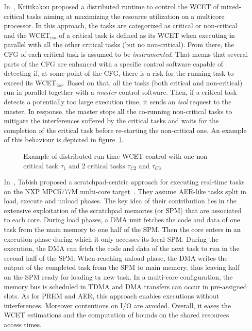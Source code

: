 \documentclass[main.tex]{subfiles}
\begin{document}
In~\cite{Kritikakou2014}, Kritikakou \etal proposed a distributed runtime to control the WCET of mixed-critical tasks aiming at maximizing the resource utilization on a multicore processor. In this approach, the tasks are categorized as critical or non-critical and the WCET$_{iso}$ of a critical task is defined as its WCET when executing in parallel with all the other critical tasks (but no non-critical). From there, the CFG of each critical task is assumed to be \emph{instrumented}. That means that several parts of the CFG are enhanced with a specific control software capable of detecting if, at some point of the CFG, there is a risk for the running task to exceed its WCET$_{iso}$. Based on that, all the tasks (both critical and non-critical) run in parallel together with a \emph{master} control software. Then, if a critical task detects a potentially too large execution time, it sends an \emph{isol} request to the master. In response, the master stops all the co-running non-critical tasks to mitigate the interferences suffered by the critical tasks and waits for the completion of the critical task before re-starting the non-critical one. An example of this behaviour is depicted in figure~\ref{fig_stateOfTheArt_DistribWCETController}. \\

\begin{figure}
    \centering
    
    \caption{Example of distributed run-time WCET control with one non-critical task $\tau_1$ and 2 critical tasks $\tau_{C2}$ and $\tau_{C3}$ }
    \label{fig_stateOfTheArt_DistribWCETController}
\end{figure}

In~\cite{Tabish2016}, Tabish \etal proposed a scratchpad-centric approach for executing real-time tasks on the NXP MPC5777M multi-core target~\cite{MPC5777M}. They assume AER-like tasks split in load, execute and unload phases. The key idea of their contribution lies in the extensive exploitation of the scratchpad memories (or SPM) that are associated to each core. During load phases, a DMA unit fetches the code and data of one task from the main memory to one half of the SPM. Then the core enters in an execution phase during which it only accesses its local SPM. During the execution, the DMA can fetch the code and data of the next task to run in the second half of the SPM. When reaching unload phase, the DMA writes the output of the completed task from the SPM to main memory, thus leaving half on the SPM ready for loading ta new task. In a multi-core configuration, the memory bus is scheduled in TDMA and DMA transfers can occur in pre-assigned slots. As for PREM and AER, this approach enables executions without interferences. Moreover contentions on I/O are avoided. Overall, it eases the WCET estimations and the computation of bounds on the shared resources access times.
\end{document}
